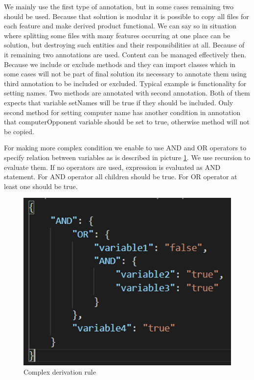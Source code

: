 \documentclass[11pt,slovak,a4paper,twoside]{article}
\begin{document}
We mainly use the first type of annotation, but in some cases remaining two should be used. Because that solution is modular it is possible to copy all files for each feature and make derived product functional. We can say so in situation where splitting some files with many features occurring at one place can be solution, but destroying such entities and their responsibilities at all. Because of it remaining two annotations are used. Content can be managed effectively then. Because we include or exclude methods and they can import classes which in some cases will not be part of final solution its necessary to annotate them using third annotation to be included or excluded. Typical example is functionality for setting names. Two methods are annotated with second annotation. Both of them expects that variable setNames will be true if they should be included. Only second method for setting computer name has another condition in annotation that computerOpponent variable should be set to true, otherwise method will not be copied. 
 
For making more complex condition we enable to use AND and OR operators to specify relation between variables as is described in picture \ref{complexDerivationRule}. We use recursion to evaluate them. If no operators are used, expression is evaluated as AND statement. For AND operator all children should be true. For OR operator at least one should be true.

\begin{figure}[t]  %
					\begin{center}
									\includegraphics[width=0.65\linewidth]{fig/expresion.png}
									\caption{Complex derivation rule}
									\label{complexDerivationRule}
					\end{center}
\end{figure}
\end{document}
